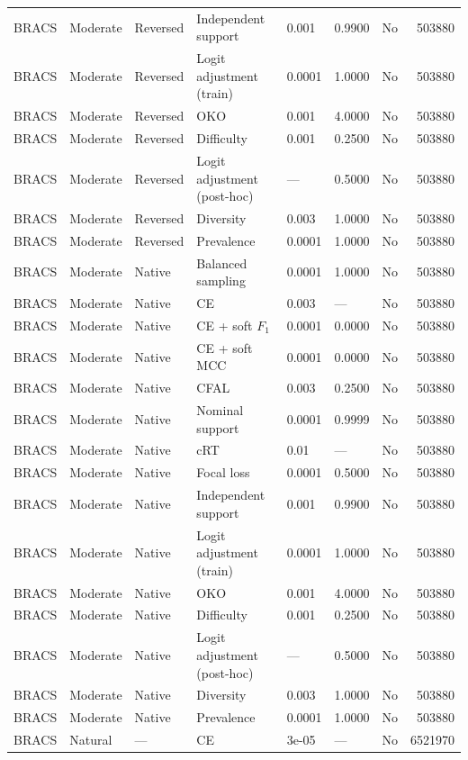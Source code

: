 \begin{longtable}{lllllllr}
BRACS & Moderate & Reversed & Independent support & 0.001 & 0.9900 & No & 503880 \\
BRACS & Moderate & Reversed & Logit adjustment (train) & 0.0001 & 1.0000 & No & 503880 \\
BRACS & Moderate & Reversed & OKO & 0.001 & 4.0000 & No & 503880 \\
BRACS & Moderate & Reversed & Difficulty & 0.001 & 0.2500 & No & 503880 \\
BRACS & Moderate & Reversed & Logit adjustment (post-hoc) & --- & 0.5000 & No & 503880 \\
BRACS & Moderate & Reversed & Diversity & 0.003 & 1.0000 & No & 503880 \\
BRACS & Moderate & Reversed & Prevalence & 0.0001 & 1.0000 & No & 503880 \\
BRACS & Moderate & Native & Balanced sampling & 0.0001 & 1.0000 & No & 503880 \\
BRACS & Moderate & Native & CE & 0.003 & --- & No & 503880 \\
BRACS & Moderate & Native & CE + soft $F_1$ & 0.0001 & 0.0000 & No & 503880 \\
BRACS & Moderate & Native & CE + soft MCC & 0.0001 & 0.0000 & No & 503880 \\
BRACS & Moderate & Native & CFAL & 0.003 & 0.2500 & No & 503880 \\
BRACS & Moderate & Native & Nominal support & 0.0001 & 0.9999 & No & 503880 \\
BRACS & Moderate & Native & cRT & 0.01 & --- & No & 503880 \\
BRACS & Moderate & Native & Focal loss & 0.0001 & 0.5000 & No & 503880 \\
BRACS & Moderate & Native & Independent support & 0.001 & 0.9900 & No & 503880 \\
BRACS & Moderate & Native & Logit adjustment (train) & 0.0001 & 1.0000 & No & 503880 \\
BRACS & Moderate & Native & OKO & 0.001 & 4.0000 & No & 503880 \\
BRACS & Moderate & Native & Difficulty & 0.001 & 0.2500 & No & 503880 \\
BRACS & Moderate & Native & Logit adjustment (post-hoc) & --- & 0.5000 & No & 503880 \\
BRACS & Moderate & Native & Diversity & 0.003 & 1.0000 & No & 503880 \\
BRACS & Moderate & Native & Prevalence & 0.0001 & 1.0000 & No & 503880 \\
BRACS & Natural & --- & CE & 3e-05 & --- & No & 6521970 \\

\end{longtable}
